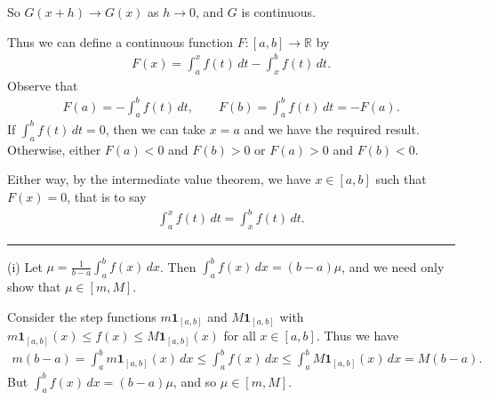 \documentclass[letterpaper,10pt,english]{jupyterBook}
\begin{document}
\sphinxAtStartPar
So \(G(x+h)\rightarrow G(x)\) as \(h\rightarrow 0\), and \(G\) is continuous.

\sphinxAtStartPar
Thus we can define a continuous function \(F\colon [a,b]\rightarrow \mathbb{R}\) by
\begin{equation*}
\begin{split}
F(x) = \int_a^x f(t)\, dt - \int_x^b f(t)\, dt.
\end{split}
\end{equation*}
\sphinxAtStartPar
Observe that
\begin{equation*}
\begin{split}
F(a) = -\int_a^b f(t)\, dt,  \qquad F(b) = \int_a^b f(t)\, dt=-F(a).
\end{split}
\end{equation*}
\sphinxAtStartPar
If \(\int_a^b f(t)\, dt =0\), then we can take \(x=a\) and we have the required result. Otherwise, either \(F(a)<0\) and \(F(b)>0\) or \(F(a)>0\) and \(F(b)<0\).

\sphinxAtStartPar
Either way, by the intermediate value theorem, we have \(x\in [a,b]\) such that \(F(x)=0\), that is to say
\begin{equation*}
\begin{split}
\int_a^x f(t)\, dt = \int_x^b f(t)\, dt.
\end{split}
\end{equation*}

\bigskip\hrule\bigskip


\sphinxAtStartPar
{\hyperref[\detokenize{Problems:id76}]{}}
(i) Let \(\mu = \frac{1}{b-a} \int_a^b f(x)\, dx\). Then \(\int_a^b f(x)\, dx=(b-a)\mu\), and we need only show that \(\mu\in[m,M]\).

\sphinxAtStartPar
Consider the step functions \(m\mathbf{1}_{[a,b]}\) and \(M\mathbf{1}_{[a,b]}\) with \(m\mathbf{1}_{[a,b]}(x)\leq f(x)\leq M\mathbf{1}_{[a,b]}(x)\) for all \(x\in[a,b]\). Thus we have
\begin{equation*}
\begin{split}
m(b-a)=\int_a^b m\mathbf{1}_{[a,b]}(x)\, dx \leq \int_a^b f(x)\, dx \leq \int_a^b M\mathbf{1}_{[a,b]}(x)\, dx= M(b-a).
\end{split}
\end{equation*}
\sphinxAtStartPar
But \(\int_a^b f(x)\, dx=(b-a)\mu\), and so \(\mu \in [m,M]\).
\end{document}
